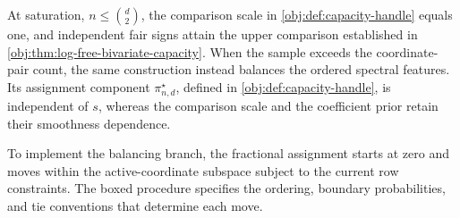 At saturation, \(n\leq\binom d2\), the comparison scale in \cref{obj:def:capacity-handle} equals one, and independent fair signs attain the upper comparison established in \cref{obj:thm:log-free-bivariate-capacity}. When the sample exceeds the coordinate-pair count, the same construction instead balances the ordered spectral features. Its assignment component \(\pi^\star_{n,d}\), defined in \cref{obj:def:capacity-handle}, is independent of \(s\), whereas the comparison scale and the coefficient prior retain their smoothness dependence.

To implement the balancing branch, the fractional assignment starts at zero and moves within the active-coordinate subspace subject to the current row constraints. The boxed procedure specifies the ordering, boundary probabilities, and tie conventions that determine each move.

